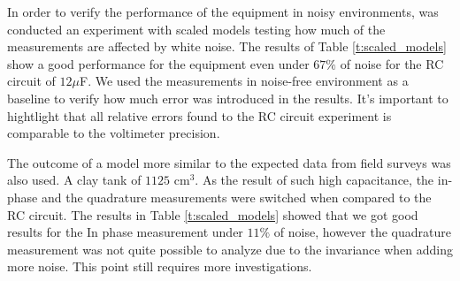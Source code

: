 \documentclass{vie16}
\begin{document}
In order to verify the performance of the equipment in noisy
environments, was conducted an experiment with scaled models testing
how much of the measurements are affected by white noise. The results
of Table \ref{t:scaled_models} show a good performance for the
equipment even under
$67\%$ of noise for the RC circuit of $12 \mu$F. We used the
measurements in noise-free environment as a baseline to verify how
much error was introduced in the results. It's important to
hightlight that all relative errors found to the RC circuit
experiment is comparable to the voltimeter precision.


The outcome of a model more similar to the expected data
from field surveys was also used. A clay tank of $1125$ cm$^3$. As the result of such high capacitance, the in-phase and the quadrature measurements were
switched when compared to the RC circuit. The results in Table
\ref{t:scaled_models} showed that we got good results for the In phase
measurement under $11\%$ of noise, however the quadrature measurement
was not quite possible to analyze due to the invariance when adding
more noise. This point still requires more investigations.
\end{document}
